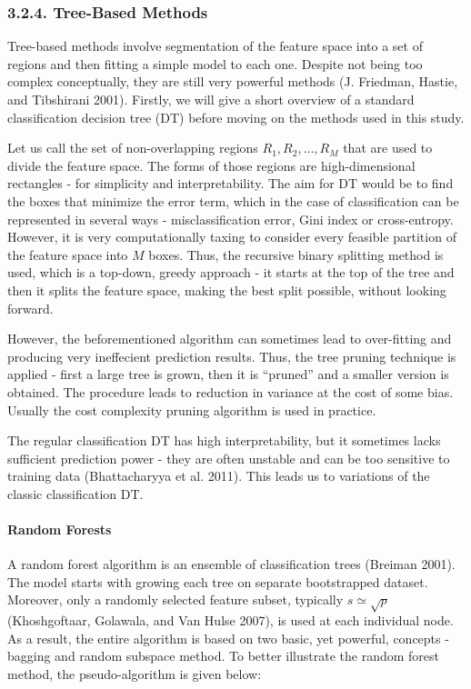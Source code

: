 \documentclass[12pt,]{article}
\let\oldparagraph\paragraph
\renewcommand{\paragraph}[1]{\oldparagraph{#1}\mbox{}}
\begin{document}
\hypertarget{tree-based-methods}{%
\subsubsection{3.2.4. Tree-Based Methods}\label{tree-based-methods}}

Tree-based methods involve segmentation of the feature space into a set
of regions and then fitting a simple model to each one. Despite not
being too complex conceptually, they are still very powerful methods (J.
Friedman, Hastie, and Tibshirani 2001). Firstly, we will give a short
overview of a standard classification decision tree (DT) before moving
on the methods used in this study.

Let us call the set of non-overlapping regions \(R_1,R_2,...,R_M\) that
are used to divide the feature space. The forms of those regions are
high-dimensional rectangles - for simplicity and interpretability. The
aim for DT would be to find the boxes that minimize the error term,
which in the case of classification can be represented in several ways -
misclassification error, Gini index or cross-entropy. However, it is
very computationally taxing to consider every feasible partition of the
feature space into \(M\) boxes. Thus, the recursive binary splitting
method is used, which is a top-down, greedy approach - it starts at the
top of the tree and then it splits the feature space, making the best
split possible, without looking forward.

However, the beforementioned algorithm can sometimes lead to
over-fitting and producing very ineffecient prediction results. Thus,
the tree pruning technique is applied - first a large tree is grown,
then it is ``pruned'' and a smaller version is obtained. The procedure
leads to reduction in variance at the cost of some bias. Usually the
cost complexity pruning algorithm is used in practice.

The regular classification DT has high interpretability, but it
sometimes lacks sufficient prediction power - they are often unstable
and can be too sensitive to training data (Bhattacharyya et al. 2011).
This leads us to variations of the classic classification DT.

\hypertarget{random-forests}{%
\paragraph{Random Forests}\label{random-forests}}

A random forest algorithm is an ensemble of classification trees
(Breiman 2001). The model starts with growing each tree on separate
bootstrapped dataset. Moreover, only a randomly selected feature subset,
typically \(s \simeq \sqrt{p}\) (Khoshgoftaar, Golawala, and Van Hulse
2007), is used at each individual node. As a result, the entire
algorithm is based on two basic, yet powerful, concepts - bagging and
random subspace method. To better illustrate the random forest method,
the pseudo-algorithm is given below:
\end{document}
